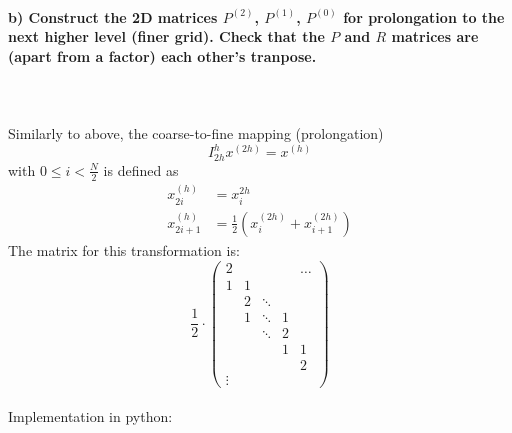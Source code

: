 \newpage
\paragraph{
    b) Construct the 2D matrices $P^{(2)}$, $P^{(1)}$, $P^{(0)}$ 
    for 
    prolongation to the next higher level (finer grid). Check that 
    the $P$ and $R$ matrices are (apart from a factor) each other’s 
    tranpose.
} \ \\
    \\
    Similarly to above, the coarse-to-fine mapping (prolongation)
    \begin{equation}
        I_{2h}^h x^{(2h)}=x^{(h)}
    \end{equation}
    with $0\leq i<\frac{N}{2}$ is defined as
    \begin{align}
            x_{2i}^{(h)}
            &=x_i^{2h} \\
            x_{2i+1}^{(h)}
            &=\frac{1}{2}(x_i^{(2h)}+x_{i+1}^{(2h)})
    \end{align}
    The matrix for this transformation is:
    \begin{equation}
        \frac{1}{2}\cdot
        \begin{pmatrix}
            2      &   &        &   & \hdots \\
            1      & 1 &        &   &        \\
                   & 2 & \ddots &   &        \\
                   & 1 & \ddots & 1 &        \\
                   &   & \ddots & 2 &        \\
                   &   &        & 1 & 1      \\
                   &   &        &   & 2      \\
            \vdots
        \end{pmatrix}
    \end{equation} \ \\
    Implementation in python: 
    

